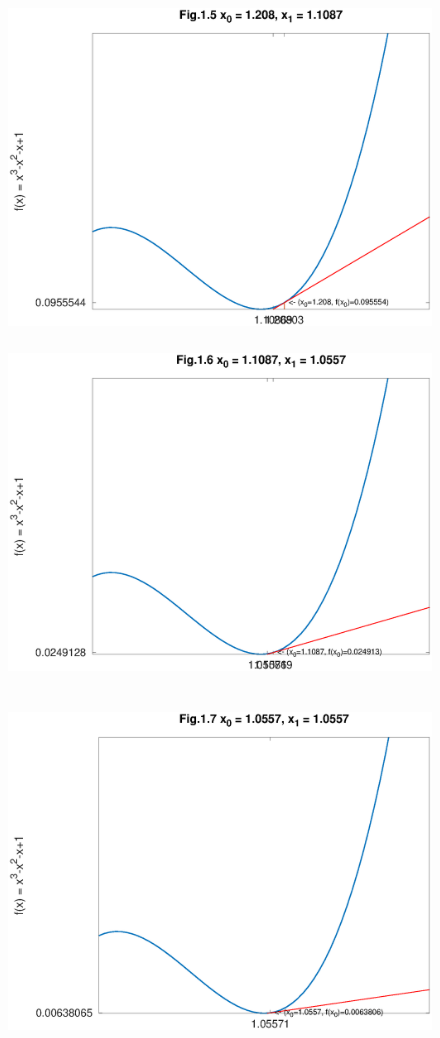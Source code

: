 \documentclass[12pt]{article}
\begin{document}
\begin{figure}[htbp]
    \begin{center}
        \includegraphics[height=90mm]{octave-fig/Fig.1.5.eps}
        \includegraphics[height=90mm]{octave-fig/Fig.1.6.eps}
    \end{center}
\end{figure}
\begin{figure}[htbp]
    \begin{center}
        \includegraphics[height=90mm]{octave-fig/Fig.1.7.eps}
    \end{center}
\end{figure}
\newpage
\end{document}
